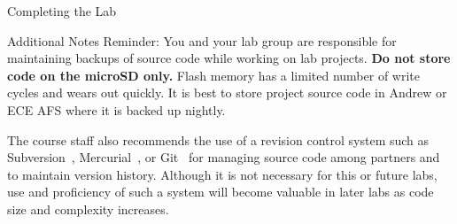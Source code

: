 \documentclass{article}
\begin{document}
\begin{section}{Completing the Lab}
		\begin{subsection}{Additional Notes}
			Reminder: You and your lab group are responsible for maintaining backups of
			source code while working on lab projects.  \textbf{Do not store code on
			the microSD only.}  Flash memory has a limited number of write cycles and wears
			out quickly.  It is best to store project source code in Andrew or ECE AFS
			where it is backed up nightly.

			The course staff also recommends the use of a revision control system such
			as Subversion~\cite{CollabNet:Subversion},
			Mercurial~\cite{Mackall:Mercurial}, or Git~\cite{Torvalds:Git} for managing
			source code among partners and to maintain version history.  Although it is
			not necessary for this or future labs, use and proficiency of such a system will
			become valuable in later labs as code size and complexity increases.
		\end{subsection}
	\end{section}
\end{document}
